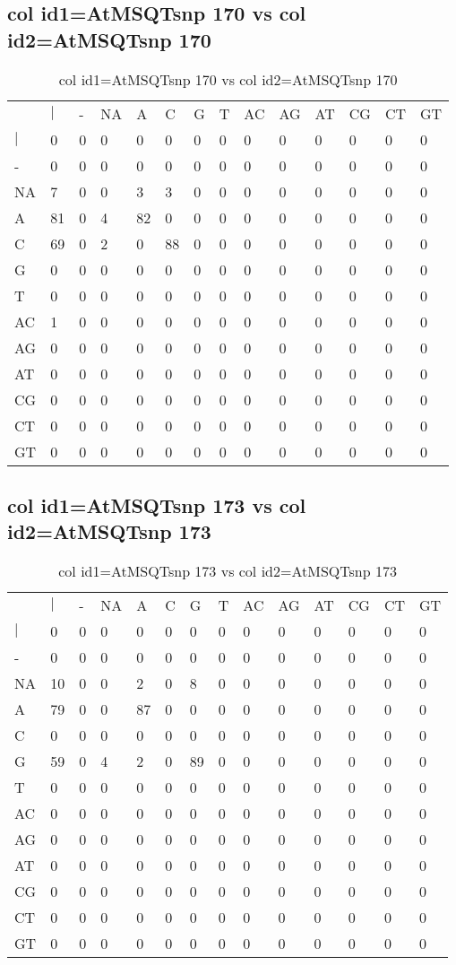 \subsection{col id1=AtMSQTsnp 170 vs col id2=AtMSQTsnp 170}
\begin{center}
\begin{longtable}{|l|l|l|l|l|l|l|l|l|l|l|l|l|l|}
\caption{col id1=AtMSQTsnp 170 vs col id2=AtMSQTsnp 170} \label{table_dm738}\\
\hline
\\
\hline
&$|$&-&NA&A&C&G&T&AC&AG&AT&CG&CT&GT\\
$|$&0&0&0&0&0&0&0&0&0&0&0&0&0\\
-&0&0&0&0&0&0&0&0&0&0&0&0&0\\
NA&7&0&0&3&3&0&0&0&0&0&0&0&0\\
A&81&0&4&82&0&0&0&0&0&0&0&0&0\\
C&69&0&2&0&88&0&0&0&0&0&0&0&0\\
G&0&0&0&0&0&0&0&0&0&0&0&0&0\\
T&0&0&0&0&0&0&0&0&0&0&0&0&0\\
AC&1&0&0&0&0&0&0&0&0&0&0&0&0\\
AG&0&0&0&0&0&0&0&0&0&0&0&0&0\\
AT&0&0&0&0&0&0&0&0&0&0&0&0&0\\
CG&0&0&0&0&0&0&0&0&0&0&0&0&0\\
CT&0&0&0&0&0&0&0&0&0&0&0&0&0\\
GT&0&0&0&0&0&0&0&0&0&0&0&0&0\\
\hline
\end{longtable}
\end{center}

\subsection{col id1=AtMSQTsnp 173 vs col id2=AtMSQTsnp 173}
\begin{center}
\begin{longtable}{|l|l|l|l|l|l|l|l|l|l|l|l|l|l|}
\caption{col id1=AtMSQTsnp 173 vs col id2=AtMSQTsnp 173} \label{table_dm740}\\
\hline
\\
\hline
&$|$&-&NA&A&C&G&T&AC&AG&AT&CG&CT&GT\\
$|$&0&0&0&0&0&0&0&0&0&0&0&0&0\\
-&0&0&0&0&0&0&0&0&0&0&0&0&0\\
NA&10&0&0&2&0&8&0&0&0&0&0&0&0\\
A&79&0&0&87&0&0&0&0&0&0&0&0&0\\
C&0&0&0&0&0&0&0&0&0&0&0&0&0\\
G&59&0&4&2&0&89&0&0&0&0&0&0&0\\
T&0&0&0&0&0&0&0&0&0&0&0&0&0\\
AC&0&0&0&0&0&0&0&0&0&0&0&0&0\\
AG&0&0&0&0&0&0&0&0&0&0&0&0&0\\
AT&0&0&0&0&0&0&0&0&0&0&0&0&0\\
CG&0&0&0&0&0&0&0&0&0&0&0&0&0\\
CT&0&0&0&0&0&0&0&0&0&0&0&0&0\\
GT&0&0&0&0&0&0&0&0&0&0&0&0&0\\
\hline
\end{longtable}
\end{center}

